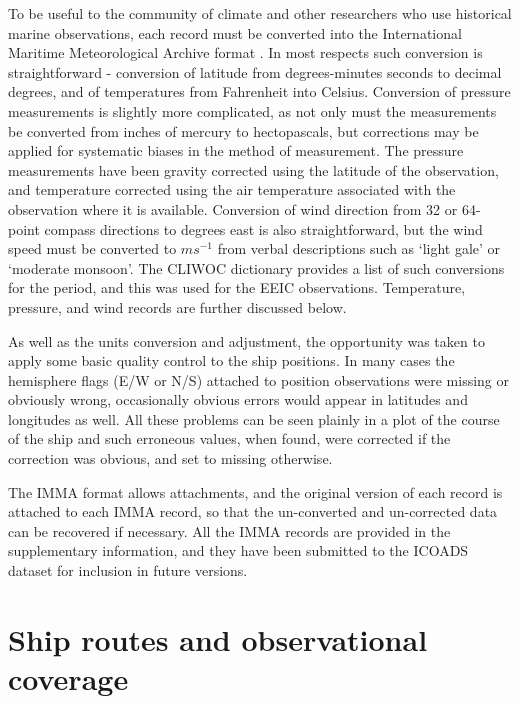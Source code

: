 \documentclass[CP]{copernicus}
\begin{document}
To be useful to the community of climate and other researchers who use historical marine observations, each record must be converted into the International Maritime Meteorological Archive format \citep{woodruff07imma}. In most respects such conversion is straightforward - conversion of latitude from degrees-minutes seconds to decimal degrees, and of temperatures from Fahrenheit into Celsius. Conversion of pressure measurements is slightly more complicated, as not only must the measurements be converted from inches of mercury to hectopascals, but corrections may be applied for systematic biases in the method of measurement. The pressure measurements have been gravity corrected using the latitude of the observation, and temperature corrected using the air temperature associated with the observation where it is available. Conversion of wind direction from 32 or 64-point compass directions to degrees east is also straightforward, but the wind speed must be converted to $ms^{-1}$ from verbal descriptions such as `light gale' or `moderate monsoon'. The CLIWOC dictionary \citep{cliwoc03dictionary} provides a list of such conversions for the period, and this was used for the EEIC observations. Temperature, pressure, and wind records are further discussed below.

As well as the units conversion and adjustment, the opportunity was taken to apply some basic quality control to the ship positions. In many cases the hemisphere flags (E/W or N/S) attached to position observations were missing or obviously wrong, occasionally obvious errors would appear in latitudes and longitudes as well. All these problems can be seen plainly in a plot of the course of the ship and such erroneous values, when found, were corrected if the correction was obvious, and set to missing otherwise. 

The IMMA format allows attachments, and the original version of each record is attached to each IMMA record, so that the un-converted and un-corrected data can be recovered if necessary. All the IMMA records are provided in the supplementary information, and they have been submitted to the ICOADS dataset for inclusion in future versions.

\section{Ship routes and observational coverage}
\end{document}
